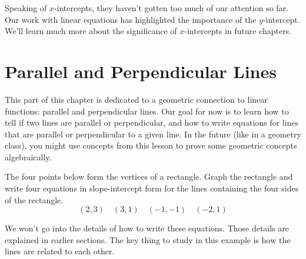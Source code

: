 Speaking of $x$-intercepts, they haven't gotten too much of our attention so far. Our work with linear equations has highlighted the importance of the $y$-intercept. We'll learn much more about the significance of $x$-intercepts in future chapters.


\section{Parallel and Perpendicular Lines}
\label{sec:parallelperpendicular}

This part of this chapter is dedicated to a geometric connection to linear functions: parallel and perpendicular lines. Our goal for now is to learn how to tell if two lines are parallel or perpendicular, and how to write equations for lines that are parallel or perpendicular to a given line. In the future (like in a geometry class), you might use concepts from this lesson to prove some geometric concepts algebraically.


\begin{boxedexplore}
The four points below form the vertices of a rectangle. Graph the rectangle and write four equations in slope-intercept form for the lines containing the four sides of the rectangle.
\[(2,3) \quad (3,1) \quad (-1,-1) \quad (-2,1)\]
\end{boxedexplore} %

We won't go into the details of how to write these equations. Those details are explained in earlier sections. The key thing to study in this example is how the lines are related to each other.

